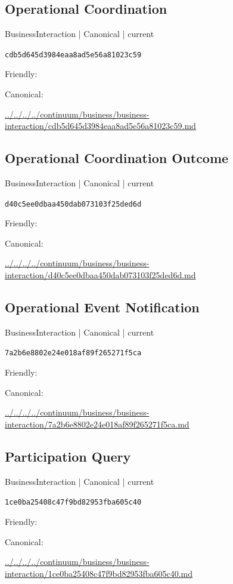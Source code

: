 \documentclass[10pt,a4paper]{article}
\begin{document}
\subsection*{Operational Coordination}
{\small BusinessInteraction | Canonical | current}\par
\texttt{cdb5d645d3984eaa8ad5e56a81023c59}\par
Friendly: \par
Canonical: \par
{\footnotesize\url{../../../../continuum/business/business-interaction/cdb5d645d3984eaa8ad5e56a81023c59.md}}\par
\subsection*{Operational Coordination Outcome}
{\small BusinessInteraction | Canonical | current}\par
\texttt{d40c5ee0dbaa450dab073103f25ded6d}\par
Friendly: \par
Canonical: \par
{\footnotesize\url{../../../../continuum/business/business-interaction/d40c5ee0dbaa450dab073103f25ded6d.md}}\par
\subsection*{Operational Event Notification}
{\small BusinessInteraction | Canonical | current}\par
\texttt{7a2b6e8802e24e018af89f265271f5ca}\par
Friendly: \par
Canonical: \par
{\footnotesize\url{../../../../continuum/business/business-interaction/7a2b6e8802e24e018af89f265271f5ca.md}}\par
\subsection*{Participation Query}
{\small BusinessInteraction | Canonical | current}\par
\texttt{1ce0ba25408c47f9bd82953fba605c40}\par
Friendly: \par
Canonical: \par
{\footnotesize\url{../../../../continuum/business/business-interaction/1ce0ba25408c47f9bd82953fba605c40.md}}\par
\end{document}
